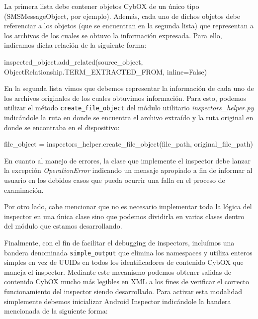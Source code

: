 La primera lista debe contener objetos CybOX de un único tipo (SMSMessageObject, por ejemplo). Además, cada uno de dichos objetos debe referenciar a los objetos (que se encuentran en la segunda lista) que representan a los archivos de los cuales se obtuvo la información expresada. Para ello, indicamos dicha relación de la siguiente forma:
\newline

\begin{python}
inspected_object.add_related(source_object,
                             ObjectRelationship.TERM_EXTRACTED_FROM,
                             inline=False)
\end{python}

En la segunda lista vimos que debemos representar la información de cada uno de los archivos originales de los cuales obtuvimos información. Para esto, podemos utilizar el método \texttt{create\_file\_object} del módulo utilitario \emph{inspectors\_helper.py} indicándole la ruta en donde se encuentra el archivo extraído y la ruta original en donde se encontraba en el dispositivo:
\newline

\begin{python}
file_object = inspectors_helper.create_file_object(file_path,
                                                   original_file_path)
\end{python}

En cuanto al manejo de errores, la clase que implemente el inspector debe lanzar la excepción \emph{OperationError} indicando un mensaje apropiado a fin de informar al usuario en los debidos casos que pueda ocurrir una falla en el proceso de examinación.

Por otro lado, cabe mencionar que no es necesario implementar toda la lógica del inspector en una única clase sino que podemos dividirla en varias clases dentro del módulo que estamos desarrollando.

Finalmente, con el fin de facilitar el debugging de inspectors, incluímos una bandera denominada \texttt{simple\_output} que elimina los namespaces y utiliza enteros simples en vez de UUIDs en todos los identificadores de contenido CybOX que maneja el inspector. Mediante este mecanismo podemos obtener salidas de contenido CybOX mucho más legibles en XML a los fines de verificar el correcto funcionamiento del inspector siendo desarrollado. Para activar esta modalidad simplemente debemos inicializar Android Inspector indicándole la bandera mencionada de la siguiente forma:
\newline

